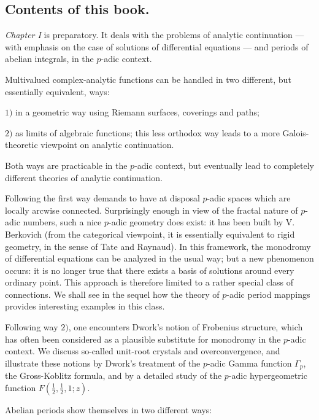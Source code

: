 \bigskip

\subsection*{Contents of this book.}

{\it Chapter I} is preparatory. It deals with the problems of analytic
continuation --- with emphasis on the case of solutions of differential
equations --- and periods of abelian integrals, in the $p$-adic context.

\medskip Multivalued complex-analytic functions can be handled in two
different, but essentially 
equivalent, ways:

$1)$ in a geometric way using Riemann surfaces, coverings and paths; 

$2)$ as limits of algebraic functions; this less orthodox way leads to a more
Galois-theoretic viewpoint on analytic continuation.

\medskip  Both ways are practicable in the $p$-adic context, but
eventually lead to completely different theories of analytic continuation. 

Following the first way demands to have at disposal $p$-adic spaces
which are locally arcwise connected.  Surprisingly enough in view of the
fractal nature of $p$-adic numbers, such a nice $p$-adic geometry does 
exist: it has been built by V. Berkovich (from the categorical
viewpoint, it is essentially equivalent to rigid geometry, in the sense
of Tate and Raynaud). In this framework, the monodromy of differential
equations can be analyzed in the usual way; but a new phenomenon occurs:
it is no longer true that there exists a basis of solutions around every
ordinary point. This approach is therefore limited to a rather special 
class of connections. We shall see in the sequel how the theory of
$p$-adic period mappings provides interesting examples in this class.
 
Following way $2)$, one encounters Dwork's notion of Frobenius
structure, which has often been considered as a plausible substitute for
monodromy in the $p$-adic context. We discuss so-called unit-root
crystals and overconvergence, and illustrate these notions by Dwork's
treatment of the $p$-adic Gamma function $\Gamma_p$, the Gross-Koblitz
formula, and by a detailed study of the $p$-adic hypergeometric function
$F(\frac{1}{2},\frac{1}{2},1; z)$.

\medskip

Abelian periods show themselves in two different ways:

